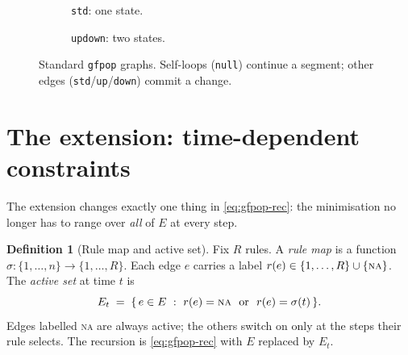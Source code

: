 \documentclass[11pt]{article}
\theoremstyle{definition}
\newtheorem{definition}{Definition}[section]
\theoremstyle{plain}
\theoremstyle{remark}
\newcommand{\Rmap}{\sigma}
\begin{document}
\begin{figure}[h]
\centering
\begin{subfigure}{0.35\textwidth}\centering
{}
\caption{\texttt{std}: one state.}
\end{subfigure}\hspace{2em}
\begin{subfigure}{0.45\textwidth}\centering
{}
\caption{\texttt{updown}: two states.}
\end{subfigure}
\caption{Standard \texttt{gfpop} graphs. Self-loops (\texttt{null}) continue a
segment; other edges (\texttt{std}/\texttt{up}/\texttt{down}) commit a change.}
\label{fig:graphs}
\end{figure}

\section{The extension: time-dependent constraints}\label{sec:extension}

The extension changes exactly one thing in \eqref{eq:gfpop-rec}: the
minimisation no longer has to range over \emph{all} of $E$ at every step.

\begin{definition}[Rule map and active set]\label{def:rule}
Fix $R$ rules. A \emph{rule map} is a function $\Rmap:\{1,\dots,n\}\to\{1,\dots,R\}$.
Each edge $e$ carries a label $r(e)\in\{1,\dots,R\}\cup\{\textsc{na}\}$. The
\emph{active set} at time $t$ is
\[
  E_t \;=\; \{\, e\in E \ :\ r(e)=\textsc{na}\ \text{ or }\ r(e)=\Rmap(t)\,\}.
\]
Edges labelled \textsc{na} are always active; the others switch on only at the
steps their rule selects. The recursion is \eqref{eq:gfpop-rec} with $E$
replaced by $E_t$.
\end{definition}
\end{document}
